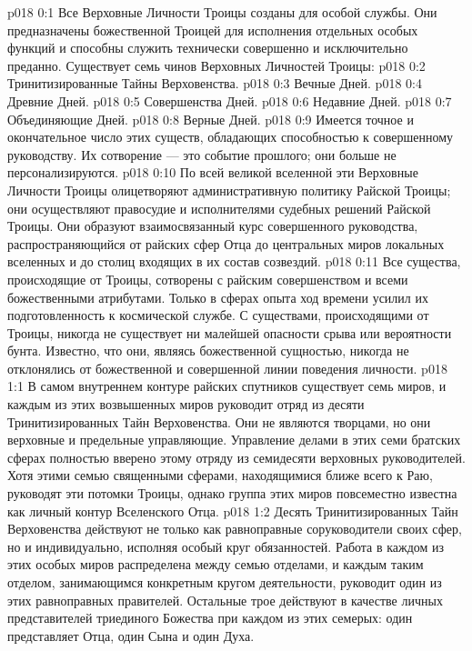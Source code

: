 \author{Божественный Советник}
\vs p018 0:1 Все Верховные Личности Троицы созданы для особой службы. Они предназначены божественной Троицей для исполнения отдельных особых функций и способны служить технически совершенно и исключительно преданно. Существует семь чинов Верховных Личностей Троицы:
\vs p018 0:2 \bibnobreakspace Тринитизированные Тайны Верховенства.
\vs p018 0:3 \bibnobreakspace Вечные Дней.
\vs p018 0:4 \bibnobreakspace Древние Дней.
\vs p018 0:5 \bibnobreakspace Совершенства Дней.
\vs p018 0:6 \bibnobreakspace Недавние Дней.
\vs p018 0:7 \bibnobreakspace Объединяющие Дней.
\vs p018 0:8 \bibnobreakspace Верные Дней.
\vs p018 0:9 \pc Имеется точное и окончательное число этих существ, обладающих способностью к совершенному руководству. Их сотворение --- это событие прошлого; они больше не персонализируются.
\vs p018 0:10 По всей великой вселенной эти Верховные Личности Троицы олицетворяют административную политику Райской Троицы; они осуществляют правосудие и  исполнителями судебных решений Райской Троицы. Они образуют взаимосвязанный курс совершенного руководства, распространяющийся от райских сфер Отца до центральных миров локальных вселенных и до столиц входящих в их состав созвездий.
\vs p018 0:11 Все существа, происходящие от Троицы, сотворены с райским совершенством и всеми божественными атрибутами. Только в сферах опыта ход времени усилил их подготовленность к космической службе. С существами, происходящими от Троицы, никогда не существует ни малейшей опасности срыва или вероятности бунта. Известно, что они, являясь божественной сущностью, никогда не отклонялись от божественной и совершенной линии поведения личности.
\vs p018 1:1 В самом внутреннем контуре райских спутников существует семь миров, и каждым из этих возвышенных миров руководит отряд из десяти Тринитизированных Тайн Верховенства. Они не являются творцами, но они верховные и предельные управляющие. Управление делами в этих семи братских сферах полностью вверено этому отряду из семидесяти верховных руководителей. Хотя этими семью священными сферами, находящимися ближе всего к Раю, руководят эти потомки Троицы, однако группа этих миров повсеместно известна как личный контур Вселенского Отца.
\vs p018 1:2 Десять Тринитизированных Тайн Верховенства действуют не только как равноправные соруководители своих сфер, но и индивидуально, исполняя особый круг обязанностей. Работа в каждом из этих особых миров распределена между семью отделами, и каждым таким отделом, занимающимся конкретным кругом деятельности, руководит один из этих равноправных правителей. Остальные трое действуют в качестве личных представителей триединого Божества при каждом из этих семерых: один представляет Отца, один Сына и один Духа.
